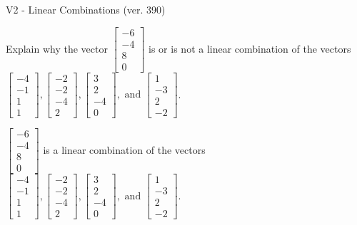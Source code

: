\begin{exercise}
  \begin{exerciseTitle}V2 - Linear Combinations (ver. 390)\end{exerciseTitle}
  \begin{exerciseStatement}
    Explain why the vector \(\left[\begin{array}{c}
-6 \\
-4 \\
8 \\
0
\end{array}\right]\)  is or is not a linear 
	combination of the vectors \(\left[\begin{array}{c}
-4 \\
-1 \\
1 \\
1
\end{array}\right] , \left[\begin{array}{c}
-2 \\
-2 \\
-4 \\
2
\end{array}\right] , \left[\begin{array}{c}
3 \\
2 \\
-4 \\
0
\end{array}\right] , \text{ and } \left[\begin{array}{c}
1 \\
-3 \\
2 \\
-2
\end{array}\right]\).
	


  \end{exerciseStatement}
  \begin{exerciseAnswer}
   \(\left[\begin{array}{c}
-6 \\
-4 \\
8 \\
0
\end{array}\right]\) 
  	 is  
	a linear combination of the vectors \(\left[\begin{array}{c}
-4 \\
-1 \\
1 \\
1
\end{array}\right] , \left[\begin{array}{c}
-2 \\
-2 \\
-4 \\
2
\end{array}\right] , \left[\begin{array}{c}
3 \\
2 \\
-4 \\
0
\end{array}\right] , \text{ and } \left[\begin{array}{c}
1 \\
-3 \\
2 \\
-2
\end{array}\right]\).


\end{exerciseAnswer}
\end{exercise}
